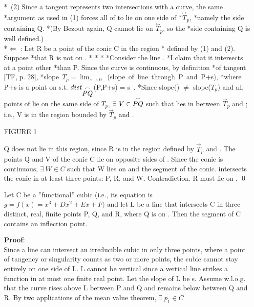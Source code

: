 *\ (2) Since a tangent represents two intersections with a curve, the same
*argument as used in (1) forces all of  to lie on one side of 
*$\stackrel{\leftrightarrow}{T}_{p}$,
*namely the side containing Q.
*(By Bezout again, Q cannot lie on $\stackrel{\leftrightarrow}{T}_{p}$, so the
*side containing Q is well defined.)\vspace{.25in}\\
*$\Leftarrow$ : Let R be a point of the conic C in the region
* defined by (1) and (2). Suppose
*that R is not on .
*%
*%
*%
*Consider the line .
*I claim that it intersects  at a point other
*than P.  Since the curve is continuous, by definition
*of tangent [TF, p. 28],
*slope~$T_{p} = \lim_{s \rightarrow 0}$~(slope~of~line~through~P~and~P+s),
*where P+s is a point on  s.t. $dist_{\mbox{$\stackrel{\frown}{PQ}$}}$(P,P+s) = s\ .
*Since slope() $\neq$ slope($T_{p}$) and all points of 
lie on the same side of $T_{p}$, $\exists\ V \in \mbox{$\stackrel{\frown}{PQ}$}$ such that
 lies in between $\vec{T}_{p}$ and ; i.e., V
is in the region bounded by $\vec{T}_{p}$ and .
\begin{center}
FIGURE 1
\end{center}
Q does not lie in this region, since R is in the region defined by
$\vec{T}_{p}$ and .
\hence The points Q and V of the conic C lie on opposite sides
of .
\hence Since the conic is continuous, $\exists\ W \in C$ such that W
lies on  and the segment  of the conic.
\hence {} intersects the conic in at least three points: P,
R, and W.  Contradiction.
\hence R must lie on .
\qed
\begin{lemma}\nopagebreak
Let C be a ''functional'' cubic (i.e., its equation is
$y = f(x) = x^{3} + Dx^{2} + Ex + F)$ and let L be a line that intersects C
in three distinct, real, finite points P, Q, and R, where Q is on
.  Then the segment  of C contains an inflection point.
\end{lemma}
{\bf Proof}:\nopagebreak\\
Since a line can intersect an irreducible cubic in only three points,
 where a point of tangency or singularity counts as two or more points,
 the cubic cannot stay entirely on one side of L.  L cannot
be vertical since a vertical line strikes a function in at most one
 finite real point.  Let the slope of L
 be s.  Assume w.l.o.g. that the curve rises
above L between P and Q and remains below between Q and R.
By two applications of the mean value theorem, $\exists\ p_{1} \in C$

